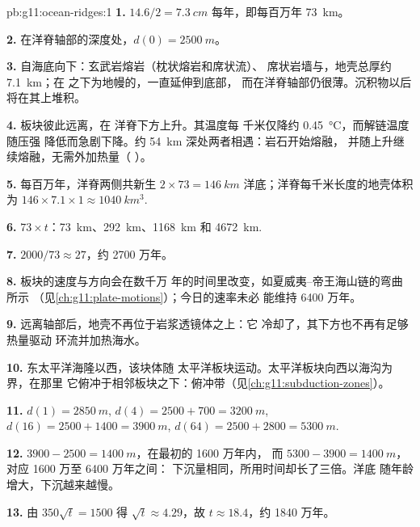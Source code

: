 \begin{solution}{pb:g11:ocean-ridges:1}
\textbf{1.} $14.6/2 = \qty{7.3}{cm}$ 每年，即每百万年
\qty{73}{km}。

\textbf{2.} 在洋脊轴部的深度处，$d(0) = \qty{2500}{m}$。

\textbf{3.} 自海底向下：玄武岩熔岩（枕状熔岩和席状流）、
席状岩墙与，地壳总厚约 \qty{7.1}{km}；在
之下为地幔的，一直延伸到底部，
而在洋脊轴部仍很薄。沉积物以后将在其上堆积。

\textbf{4.} 板块彼此远离，在
洋脊下方上升。其温度每
千米仅降约 \qty{0.45}{\celsius}，而解链温度随压强
降低而急剧下降。约 \qty{54}{km} 深处两者相遇：岩石开始熔融，
并随上升继续熔融，无需外加热量（
）。

\textbf{5.} 每百万年，洋脊两侧共新生 $2 \times 73 = \qty{146}{km}$
洋底；洋脊每千米长度的地壳体积为
$146 \times 7.1 \times 1 \approx \qty{1040}{km^3}$.

\textbf{6.} $73 \times t$：\qty{73}{km}、\qty{292}{km}、\qty{1168}{km} 和
\qty{4672}{km}.

\textbf{7.} $2000/73 \approx 27$，约 2700 万年。

\textbf{8.} 板块的速度与方向会在数千万
年的时间里改变，如夏威夷–帝王海山链的弯曲所示
（见\cref{ch:g11:plate-motions}）；今日的速率未必
能维持 6400 万年。

\textbf{9.} 远离轴部后，地壳不再位于岩浆透镜体之上：它
冷却了，其下方也不再有足够热量驱动
环流并加热海水。

\textbf{10.} 东太平洋海隆以西，该块体随
太平洋板块运动。太平洋板块向西以海沟为界，在那里
它俯冲于相邻板块之下：俯冲带（见\cref{ch:g11:subduction-zones}）。

\textbf{11.} $d(1) = \qty{2850}{m}$, $d(4) = 2500 + 700 = \qty{3200}{m}$,
$d(16) = 2500 + 1400 = \qty{3900}{m}$, $d(64) = 2500 + 2800 = \qty{5300}{m}$.

\textbf{12.} $3900 - 2500 = \qty{1400}{m}$，在最初的 1600 万年内，
而 $5300 - 3900 = \qty{1400}{m}$，对应 1600 万至 6400 万年之间：
下沉量相同，所用时间却长了三倍。洋底
随年龄增大，下沉越来越慢。

\textbf{13.} 由 $350\sqrt{t} = 1500$ 得 $\sqrt{t} \approx 4.29$，故
$t \approx 18.4$，约 1840 万年。


\end{solution}
